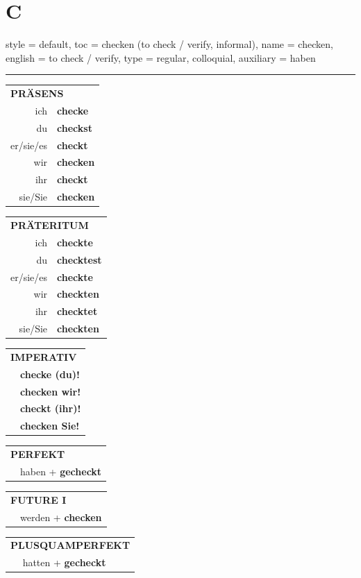 \section{C}

\begin{verbentry}{
  style = {default},
  toc = {checken (to check / verify, informal)},
  name = {checken},
  english = {to check / verify},
  type = {regular, colloquial},
  auxiliary = {haben}
}


\vspace{5pt}
\hrule
\vspace{5pt}

\begin{tabular}{rl}
\multicolumn{2}{l}{\textbf{PRÄSENS}}\\
ich & \textbf{checke}\\
du & \textbf{checkst}\\
er/sie/es & \textbf{checkt}\\
wir & \textbf{checken}\\
ihr & \textbf{checkt}\\
sie/Sie & \textbf{checken}\\
\end{tabular}
\hfill
\begin{tabular}{rl}
\multicolumn{2}{l}{\textbf{PRÄTERITUM}}\\
ich & \textbf{checkte}\\
du & \textbf{checktest}\\
er/sie/es & \textbf{checkte}\\
wir & \textbf{checkten}\\
ihr & \textbf{checktet}\\
sie/Sie & \textbf{checkten}\\
\end{tabular}
\hfill
\begin{tabular}{rl}
\multicolumn{2}{l}{\textbf{IMPERATIV}}\\
& \textbf{checke (du)!}\\
& \textbf{checken wir!}\\
& \textbf{checkt (ihr)!}\\
& \textbf{checken Sie!}\\
\end{tabular}

\vspace{10pt}

\begin{tabular}{rl}
\multicolumn{2}{l}{\textbf{PERFEKT}}\\
& haben + \textbf{gecheckt}\\
\end{tabular}
\hfill
\begin{tabular}{rl}
\multicolumn{2}{l}{\textbf{FUTURE I}}\\
& werden + \textbf{checken}\\
\end{tabular}
\hfill
\begin{tabular}{rl}
\multicolumn{2}{l}{\textbf{PLUSQUAMPERFEKT}}\\
& hatten + \textbf{gecheckt}\\
\end{tabular}


\end{verbentry}
